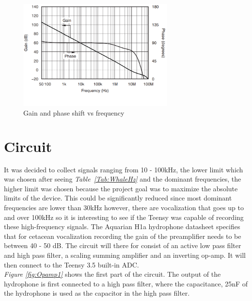 \begin{figure}[h]
    \centering
    \includegraphics[width=0.7\textwidth]{graphics/dbVsfreq.png}
    \caption{Gain and phase shift vs frequency\cite{noauthor_opa164x_nodate}}
    \label{fig:dbvsFreq}
\end{figure}


\vspace{4cm}


\section{Circuit}\label{sec:CircResult}

It was decided to collect signals ranging from 10 - 100kHz, the lower limit which was chosen after seeing \textit{Table~\ref{Tab:WhaleHz}} and the dominant frequencies, the higher limit was chosen because the project goal was to maximize the absolute limits of the device.
This could be significantly reduced since most dominant frequencies are lower than 30kHz however, there are vocalization that goes up to and over 100kHz so it is interesting to see if the Teensy was capable of recording these high-frequency signals.
The Aquarian H1a hydrophone datasheet specifies that for cetacean vocalization recording the gain of the preamplifier needs to be between 40 - 50 dB\cite{noauthor_aquarian_nodate}.
The circuit will there for consist of an active low pass filter and high pass filter, a scaling summing amplifier and an inverting op-amp.
It will then connect to the Teensy 3.5 built-in ADC.\\
\indent \textit{Figure \ref{fig:Opamp1}} shows the first part of the circuit.
The output of the hydrophone is first connected to a high pass filter, where the capacitance, 25nF of the hydrophone is used as the capacitor in the high pass filter.

